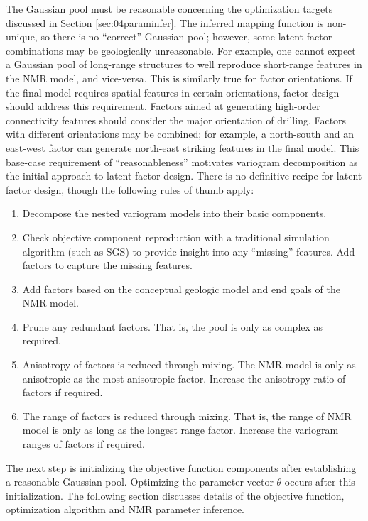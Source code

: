 The Gaussian pool must be reasonable concerning the optimization targets discussed in Section \ref{sec:04paraminfer}. The inferred mapping function is non-unique, so there is no ``correct'' Gaussian pool; however, some latent factor combinations may be geologically unreasonable. For example, one cannot expect a Gaussian pool of long-range structures to well reproduce short-range features in the \gls{NMR} model, and vice-versa. This is similarly true for factor orientations. If the final model requires spatial features in certain orientations, factor design should address this requirement. Factors aimed at generating high-order connectivity features should consider the major orientation of drilling. Factors with different orientations may be combined; for example, a north-south and an east-west factor can generate north-east striking features in the final model. This base-case requirement of ``reasonableness'' motivates variogram decomposition as the initial approach to latent factor design. There is no definitive recipe for latent factor design, though the following rules of thumb apply:
\begin{enumerate}[noitemsep]
    \item Decompose the nested variogram models into their basic components.
    \item Check objective component reproduction with a traditional simulation algorithm (such as \gls{SGS}) to provide insight into any ``missing'' features. Add factors to capture the missing features.
    \item Add factors based on the conceptual geologic model and end goals of the \gls{NMR} model.
    \item Prune any redundant factors. That is, the pool is only as complex as required.
    \item Anisotropy of factors is reduced through mixing. The \gls{NMR} model is only as anisotropic as the most anisotropic factor. Increase the anisotropy ratio of factors if required.
    \item The range of factors is reduced through mixing. That is, the range of \gls{NMR} model is only as long as the longest range factor. Increase the variogram ranges of factors if required.
\end{enumerate}

The next step is initializing the objective function components after establishing a reasonable Gaussian pool. Optimizing the parameter vector $\theta$ occurs after this initialization. The following section discusses details of the objective function, optimization algorithm and \gls{NMR} parameter inference.


